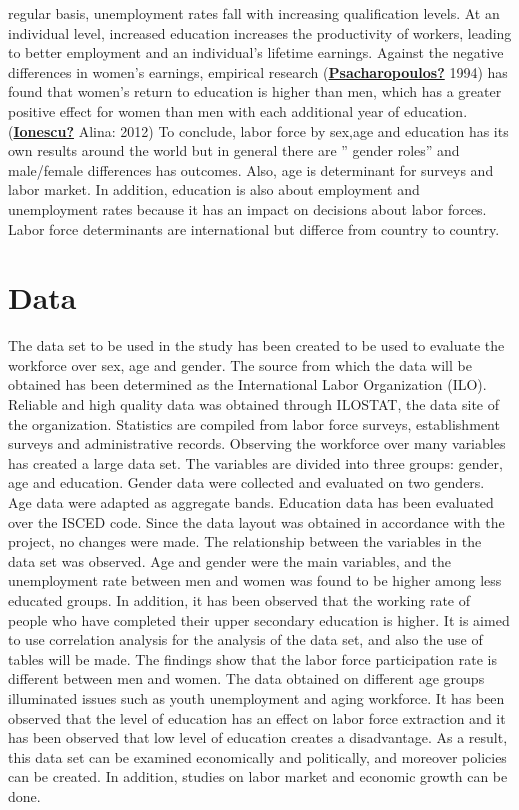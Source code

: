 \documentclass[
  12pt,
]{article}
\begin{document}
regular basis, unemployment rates fall with increasing qualification levels. At an individual level, increased education increases the productivity of workers, leading to better employment and an individual's lifetime earnings. Against the negative differences in women's earnings, empirical research (\protect\hyperlink{ref-Psacharopoulos}{\textbf{Psacharopoulos?}} 1994) has found that women's return to education is higher than men, which has a greater positive effect for women than men with each additional year of education. (\protect\hyperlink{ref-Ionescu}{\textbf{Ionescu?}} Alina: 2012)
To conclude, labor force by sex,age and education has its own results around the world but in general there are '' gender roles'' and male/female differences has outcomes. Also, age is determinant for surveys and labor market. In addition, education is also about employment and unemployment rates because it has an impact on decisions about labor forces. Labor force determinants are international but differce from country to country.

\hypertarget{data}{%
\section{Data}\label{data}}

The data set to be used in the study has been created to be used to evaluate the workforce over sex, age and gender. The source from which the data will be obtained has been determined as the International Labor Organization (ILO). Reliable and high quality data was obtained through ILOSTAT, the data site of the organization. Statistics are compiled from labor force surveys, establishment surveys and administrative records. Observing the workforce over many variables has created a large data set. The variables are divided into three groups: gender, age and education. Gender data were collected and evaluated on two genders. Age data were adapted as aggregate bands. Education data has been evaluated over the ISCED code. Since the data layout was obtained in accordance with the project, no changes were made. The relationship between the variables in the data set was observed. Age and gender were the main variables, and the unemployment rate between men and women was found to be higher among less educated groups. In addition, it has been observed that the working rate of people who have completed their upper secondary education is higher. It is aimed to use correlation analysis for the analysis of the data set, and also the use of tables will be made. The findings show that the labor force participation rate is different between men and women. The data obtained on different age groups illuminated issues such as youth unemployment and aging workforce. It has been observed that the level of education has an effect on labor force extraction and it has been observed that low level of education creates a disadvantage. As a result, this data set can be examined economically and politically, and moreover policies can be created. In addition, studies on labor market and economic growth can be done.
\end{document}
